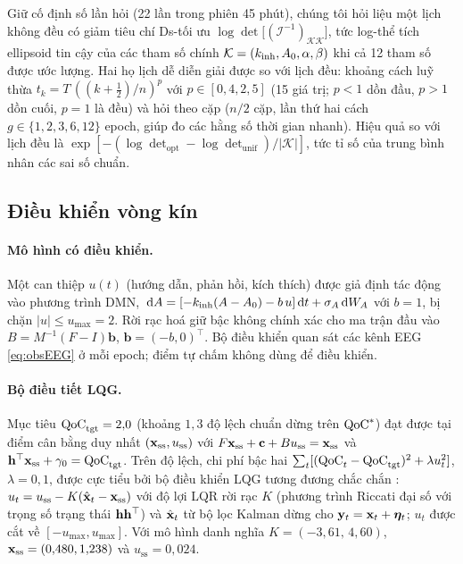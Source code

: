 Giữ cố định số lần hỏi (22 lần trong phiên 45 phút), chúng tôi hỏi liệu một lịch không đều có giảm tiêu chí Ds-tối ưu \citep{Pukelsheim1993,Atkinson2007} $\log\det\bigl[(\mathcal I^{-1})_{\mathcal K\mathcal K}\bigr]$, tức log-thể tích ellipsoid tin cậy của các tham số chính $\mathcal K=(k_{\mathrm{inh}},A_0,\alpha,\beta)$ khi cả 12 tham số được ước lượng. Hai họ lịch dễ diễn giải được so với lịch đều: khoảng cách luỹ thừa $t_k=T\,((k+\tfrac12)/n)^p$ với $p\in[0{,}4,2{,}5]$ (15 giá trị; $p<1$ dồn đầu, $p>1$ dồn cuối, $p=1$ là đều) và hỏi theo cặp ($n/2$ cặp, lần thứ hai cách $g\in\{1,2,3,6,12\}$ epoch, giúp đo các hằng số thời gian nhanh). Hiệu quả so với lịch đều là $\exp[-(\log\det_{\mathrm{opt}}-\log\det_{\mathrm{unif}})/|\mathcal K|]$, tức tỉ số của trung bình nhân các sai số chuẩn.

\subsection{Điều khiển vòng kín}
\label{sec:control-methods}

\paragraph{Mô hình có điều khiển.} Một can thiệp $u(t)$ (hướng dẫn, phản hồi, kích thích) được giả định tác động vào phương trình DMN, $\,\mathrm{d} A=[-k_{\mathrm{inh}}(A-A_0)-b\,u]\,\mathrm{d} t+\sigma_{A}\,\mathrm{d} W_A$ với $b=1$, bị chặn $|u|\le u_{\max}=2$. Rời rạc hoá giữ bậc không chính xác cho ma trận đầu vào $B=M^{-1}(F-I)\mathbf b$, $\mathbf b=(-b,0)^\top$. Bộ điều khiển quan sát các kênh EEG \eqref{eq:obsEEG} ở mỗi epoch; điểm tự chấm không dùng để điều khiển.

\paragraph{Bộ điều tiết LQG.} Mục tiêu $\mathrm{QoC}_{\mathrm{tgt}}=2{,}0$ (khoảng $1{,}3$ độ lệch chuẩn dừng trên $\mathrm{QoC}^*$) đạt được tại điểm cân bằng duy nhất $(\mathbf{x}_{\mathrm{ss}},u_{\mathrm{ss}})$ với $F\mathbf{x}_{\mathrm{ss}}+\mathbf c+Bu_{\mathrm{ss}}=\mathbf{x}_{\mathrm{ss}}$ và $\mathbf{h}^\top\mathbf{x}_{\mathrm{ss}}+\gamma_0=\mathrm{QoC}_{\mathrm{tgt}}$. Trên độ lệch, chi phí bậc hai $\sum_t[(\mathrm{QoC}_t-\mathrm{QoC}_{\mathrm{tgt}})^2+\lambda u_t^2]$, $\lambda=0{,}1$, được cực tiểu bởi bộ điều khiển LQG tương đương chắc chắn \citep{Astrom1970,Anderson1990}: $u_t=u_{\mathrm{ss}}-K(\hat{\mathbf{x}}_t-\mathbf{x}_{\mathrm{ss}})$ với độ lợi LQR rời rạc $K$ (phương trình Riccati đại số với trọng số trạng thái $\mathbf{h}\mathbf{h}^\top$) và $\hat{\mathbf{x}}_t$ từ bộ lọc Kalman dừng cho $\mathbf{y}_t=\mathbf{x}_t+\boldsymbol\eta_t$; $u_t$ được cắt về $[-u_{\max},u_{\max}]$. Với mô hình danh nghĩa $K=(-3{,}61,\,4{,}60)$, $\mathbf{x}_{\mathrm{ss}}=(0{,}480,1{,}238)$ và $u_{\mathrm{ss}}=0{,}024$.

